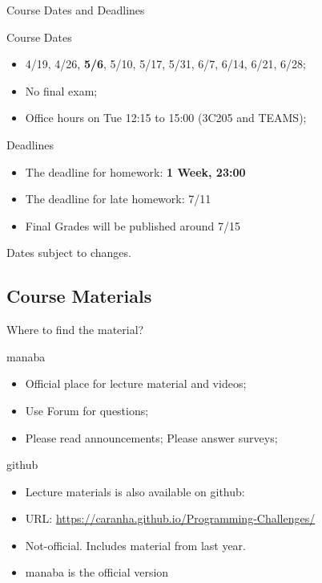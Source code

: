 \begin{frame}{Course Dates and Deadlines}
  \begin{block}{Course Dates}
    \begin{itemize}
    \item 4/19, 4/26, \alert{\bf 5/6}, 5/10, 5/17, 5/31, 6/7, 6/14, 6/21, 6/28;
    \item No final exam;
    \item Office hours on Tue 12:15 to 15:00 (3C205 and TEAMS);
    \end{itemize}
  \end{block}
  \begin{block}{Deadlines}
    \begin{itemize}
      \item The deadline for homework: {\bf 1 Week, 23:00}
      \item The deadline for late homework: 7/11
      \item Final Grades will be published around 7/15
    \end{itemize}
  \end{block}
  Dates subject to changes.
\end{frame}

\subsection{Course Materials}
\begin{frame}{Where to find the material?}
  \begin{block}{manaba}
    \begin{itemize}
      \item Official place for lecture material and videos;
      \item Use Forum for questions;
      \item Please read announcements; Please answer surveys;
    \end{itemize}
  \end{block}
  \begin{block}{github}
    \begin{itemize}
      \item Lecture materials is also available on github:
      \item URL: \url{https://caranha.github.io/Programming-Challenges/}
      \item Not-official. Includes material from last year.
      \item manaba is the official version
    \end{itemize}
  \end{block}
\end{frame}


